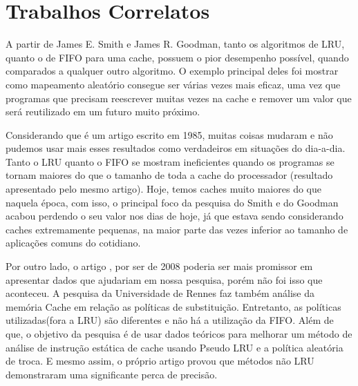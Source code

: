 \section{Trabalhos Correlatos}


    A partir de James E. Smith e James R. Goodman\cite{b1}, tanto os algoritmos de LRU, quanto o de FIFO para
    uma cache, possuem o pior desempenho possível, quando comparados a qualquer outro algoritmo. 
    O exemplo principal deles foi mostrar como mapeamento aleatório consegue ser várias vezes mais eficaz, 
    uma vez que programas que precisam reescrever muitas vezes na cache e remover um valor que será reutilizado 
    em um futuro muito próximo.

    Considerando que \cite{b1} é um artigo escrito em 1985, muitas coisas mudaram e não pudemos usar mais esses resultados
    como verdadeiros em situações do dia-a-dia. Tanto o LRU quanto o FIFO se mostram ineficientes quando
    os programas se tornam maiores do que o tamanho de toda a cache do processador (resultado apresentado pelo mesmo artigo). 
    Hoje, temos caches muito maiores do que naquela época, com isso, o principal foco da pesquisa do Smith e 
    do Goodman acabou perdendo o seu valor nos dias de hoje, já que estava sendo considerando caches extremamente pequenas, na maior 
    parte das vezes inferior ao tamanho de aplicações comuns do cotidiano.

    Por outro lado, o artigo \cite{b2}, por ser de 2008 poderia ser mais promissor em apresentar 
    dados que ajudariam em nossa pesquisa, porém não foi isso que aconteceu. A pesquisa da Universidade de 
    Rennes faz também análise da memória Cache em relação as políticas de substituição. Entretanto, as políticas 
    utilizadas(fora a LRU) são diferentes e não há a utilização da FIFO. Além de que, o objetivo da pesquisa é de usar 
    dados teóricos para melhorar um método de análise de instrução estática de cache usando Pseudo LRU e a política 
    aleatória de troca. E mesmo assim, o próprio artigo provou que métodos não LRU demonstraram uma significante perca de precisão.


